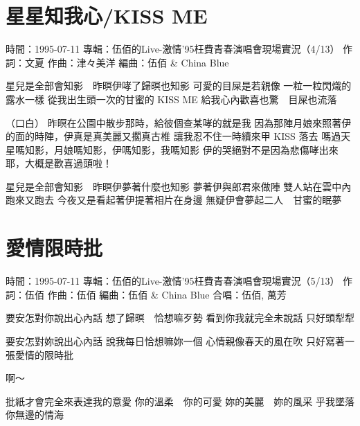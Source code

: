 \documentclass[UTF8,a4paper,oneside,twocolumn,12pt]{ctexbook}
\newcommand{\infopair}[2]{\textbullet #1：#2}
\newcommand{\zc}[1][伍佰]{\infopair{作詞}{#1}}
\newcommand{\zq}[1][伍佰]{\infopair{作曲}{#1}}
\newcommand{\bq}[1][伍佰]{\infopair{編曲}{#1}}
\newcommand{\zj}[1]{\infopair{專輯}{#1}}
\newcommand{\sj}[1]{\infopair{時間}{#1}}
\newenvironment{info}{\begin{flushleft}\kaishu
	}
	{\end{flushleft}\normalsize\yahei\par}
\newenvironment{lyric}{
	}
{}
\begin{document}
\section{星星知我心/KISS ME}
\begin{info}
	\sj{1995-07-11}
	\zj{伍佰的Live-激情'95枉費青春演唱會現場實況（4/13）}
	\zc[文夏] %
	\zq[津々美洋]
	\bq[伍佰 \& China Blue]
\end{info}
\begin{lyric}
	星兒是全部會知影　昨暝伊哮了歸暝也知影
	可愛的目屎是若親像
	一粒一粒閃熾的露水一樣
	從我出生頭一次的甘蜜的 KISS ME
	給我心內歡喜也驚　目屎也流落

	（口白）
	昨暝在公園中散步那時，給彼個查某哮的就是我
	因為那陣月娘來照著伊的面的時陣，伊真是真美麗又擱真古椎
	讓我忍不住一時續來甲 KISS 落去
	嗎過天星嗎知影，月娘嗎知影，伊嗎知影，我嗎知影
	伊的哭絕對不是因為悲傷哮出來耶，大概是歡喜過頭啦！

	星兒是全部會知影　昨暝伊夢著什麼也知影
	夢著伊與郎君來做陣
	雙人站在雲中內跑來又跑去
	今夜又是看起著伊提著相片在身邊
	無疑伊會夢起二人　甘蜜的眠夢
\end{lyric}

\section{愛情限時批}
\begin{info}
	\sj{1995-07-11}
	\zj{伍佰的Live-激情'95枉費青春演唱會現場實況（5/13）}
	\zc
	\zq
	\bq[伍佰 \& China Blue]
	\infopair{合唱}{伍佰, 萬芳}
\end{info}
\begin{lyric}
	要安怎對你說出心內話
	想了歸暝　恰想嘛歹勢
	看到你我就完全未說話
	只好頭犁犁

	要安怎對妳說出心內話
	說我每日恰想嘛妳一個
	心情親像春天的風在吹
	只好寫著一張愛情的限時批

	啊～

	批紙才會完全來表達我的意愛
	你的溫柔　你的可愛  妳的美麗　妳的風采
	乎我墜落你無邊的情海
\end{lyric}
\end{document}
